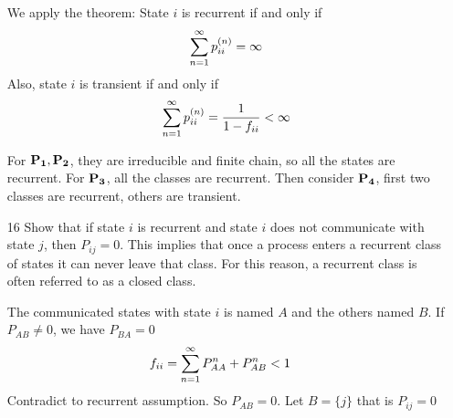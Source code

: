 \documentclass[en,hazy,blue,12pt,device = normal]{elegantnote}
\begin{document}
\begin{enumerate}
\begin{tcolorbox}
        We apply the theorem: State \(i\) is recurrent if and only if \[\sum_{n=1}^{\infty} p_{i i} ^{(n)} = \infty\]
        Also, state \(i\) is transient if and only if \[\sum_{n=1}^{\infty} p_{i i} ^{(n)} = \frac{1}{1 - f_{ii}} < \infty\]

        For \({\bf P_1,P_2}\), they are irreducible and finite chain, so all the states are recurrent. For \({\bf P_3}\), all the classes are recurrent. Then consider \({\bf P_4}\), first two classes are recurrent, others are transient.
    \end{tcolorbox}

    \item[16] Show that if state \(i\) is recurrent and state \(i\) does not communicate with state \(j\), then \(P_{i j}=0\). This implies that once a process enters a recurrent class of states it can never leave that class. For this reason, a recurrent class is often referred to as a closed class.
    
    \begin{tcolorbox}
        \sol

        The communicated states with state \(i\) is named \(A\) and the others named \(B\). If \(P_{AB} \neq 0\), we have \(P_{BA} = 0\)
        \begin{align*}
            f_{ii } &= \sum_{n=1}^{\infty} P_{AA}^n + P_{AB}^n  < 1
        \end{align*}
        Contradict to recurrent assumption. So \(P_{AB} = 0\). Let \(B = \{j \}\) that is \(P_{ij } = 0\)
    \end{tcolorbox}
\end{enumerate}
\end{document}
